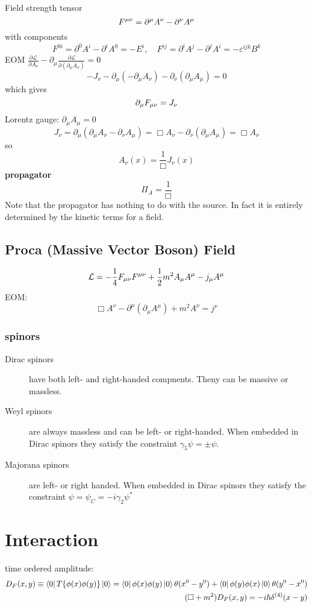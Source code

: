 Field strength tensor 
\[ F^{\mu\nu} = \partial^{\mu}A^{\nu} - \partial^{\nu}A^{\mu} \] 
with components 
\[ F^{0i} = \partial^{0}A^{i} - \partial^{i}A^{0} = -E^{i}, 
\quad
F^{ij} = \partial^{i}A^{j} - \partial^{j}A^{i} = -\varepsilon^{ijk}B^{k} \]
EOM
$\frac{\partial\mathcal{L}}{\partial{A_\nu}}-\partial_\mu\frac{\partial\mathcal{L}}{\partial(\partial_{\mu}A_\nu)}=0$
\[-J_\nu-\partial_\mu(-\partial_{\mu}A_\nu)-\partial_\nu(\partial_{\mu}A_\mu)=0\]
which gives
\[\partial_{\mu}F_{\mu\nu}=J_\nu\]
Lorentz gauge: $\partial_{\mu}A_{\mu}=0$
\[J_{\nu}=\partial_{\mu}(\partial_{\mu}A_\nu-\partial_{\nu}A_{\mu})=\Box{A_\nu}-\partial_{\nu}(\partial_{\mu}A_{\mu})
=\Box{A_{\nu}}\]
so
\[A_{\nu}(x)=\frac{1}{\Box}J_{\nu}(x)\]
\textbf{propagator}
\[\Pi_A=\frac{1}{\Box}\]
Note that the propagator has nothing to do with the source. In fact it is
entirely determined by the kinetic terms for a field.

\subsection{Proca (Massive Vector Boson) Field}
$$ \mathcal{L} = -\frac{1}{4}F_{\mu\nu}F^{\mu\nu} +
\frac{1}{2}m^{2}A_{\mu}A^{\mu} - j_{\mu}A^{\mu} $$
EOM:
$$ \Box A^{\nu} - \partial^{\mu}(\partial_{\mu}A^{\mu}) + m^{2}A^{\nu} =
j^{\nu}$$

\subsubsection{spinors}
\begin{description}
    \item[Dirac spinors] have both left- and right-handed compnents. Theny
	can be massive or massless.
    \item[Weyl spinors] are always massless and can be left- or
	right-handed. When embedded in Dirac spinors they satisfy the
	constraint $\gamma_5\psi=\pm\psi$.
    \item[Majorana spinors] are left- or right handed. When embedded in
	Dirac spinors they satisfy the constraint
	$\psi=\psi_C=-i\gamma_2\psi^*$
\end{description}

\section{Interaction}

time ordered amplitude: 
\[
    \begin{aligned}
	D_F(x,y) \equiv \bra{0}T\{\phi(x)\phi(y)\}\ket{0} = \bra{0}\phi(x)\phi(y)\ket{0}\theta(x^0-y^0) + \bra{0}\phi(y)\phi(x)\ket{0}\theta(y^0-x^0)     \\
	(\Box + m^2)D_F(x,y) = -i\hbar\delta^{(4)}(x-y)
    \end{aligned}
    \]

